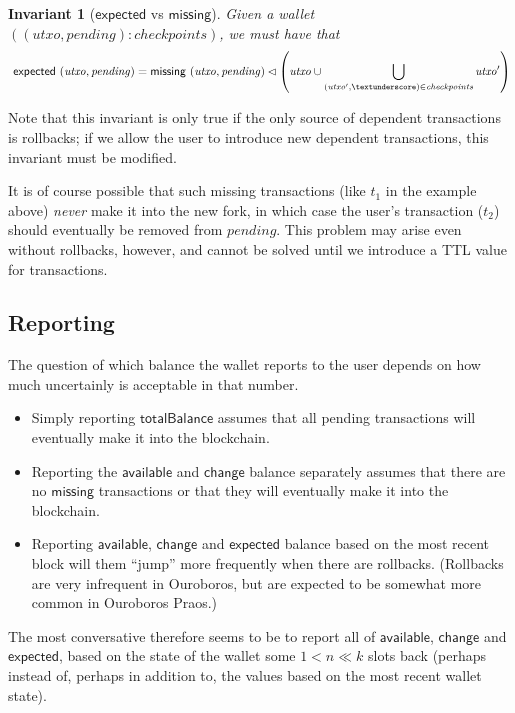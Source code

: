 \documentclass{article}
\newcommand{\restrictdom}{\lhd}
\newtheorem{invariant}{Invariant}
\begin{document}
\begin{invariant}[$\mathsf{expected}$ vs $\mathsf{missing}$]
Given a wallet $((\mathit{utxo}, \mathit{pending}) : \mathit{checkpoints})$,
we must have that
\begin{equation*}
  ~ \mathsf{expected} ~ (\mathit{utxo}, \mathit{pending})
= \mathsf{missing} ~ (\mathit{utxo}, \mathit{pending}) \restrictdom \left( \mathit{utxo} \cup \bigcup_{(\mathit{utxo}', \textunderscore) \in \mathit{checkpoints}} \mathit{utxo}' \right)
\end{equation*}
\end{invariant}

Note that this invariant is only true if the only source of dependent transactions
is rollbacks; if we allow the user to introduce new dependent transactions,
this invariant must be modified.

It is of course possible that such missing transactions (like $t_1$ in the
example above) \emph{never} make it into the new fork, in which case the user's
transaction ($t_2$) should eventually be removed from $\mathit{pending}$. This
problem may arise even without rollbacks, however, and cannot be solved until we
introduce a TTL value for transactions.

\subsection{Reporting}
\label{sec:reporting}

The question of which balance the wallet reports to the user depends on how
much uncertainly is acceptable in that number.

\begin{itemize}
\item Simply reporting $\mathsf{totalBalance}$ assumes that all pending
transactions will eventually make it into the blockchain.
\item Reporting the $\mathsf{available}$ and $\mathsf{change}$ balance separately
assumes that there are no $\mathsf{missing}$ transactions or that they will
eventually make it into the blockchain.
\item Reporting $\mathsf{available}$, $\mathsf{change}$ and $\mathsf{expected}$
balance based on the most recent block will them ``jump'' more frequently
when there are rollbacks. (Rollbacks are very infrequent in Ouroboros,
but are expected to be somewhat more common in Ouroboros Praos.)
\end{itemize}

The most conversative therefore seems to be to report all of
$\mathsf{available}$, $\mathsf{change}$ and $\mathsf{expected}$, based on the
state of the wallet some $1 < n \ll k$ slots back (perhaps instead of,
perhaps in addition to, the values based on the most recent wallet state).
\end{document}
